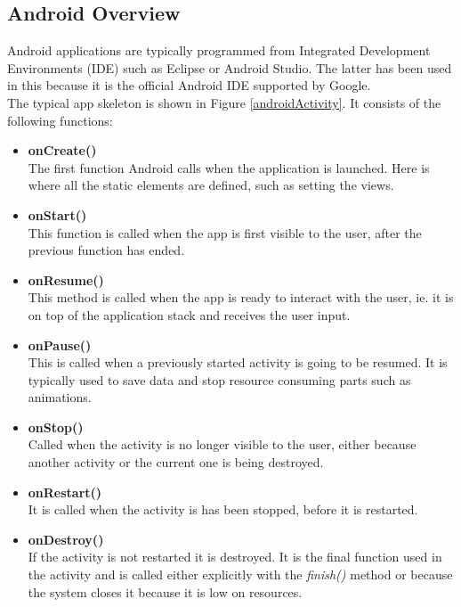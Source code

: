 \subsection{Android Overview}

Android applications are typically programmed from Integrated Development Environments (IDE) such as  Eclipse or Android Studio. The latter has been used in this because it is the official Android IDE supported by Google. \\

The typical app skeleton is shown in Figure \ref{androidActivity}. It consists of the following functions:

	\begin{itemize}

	\item \textbf{onCreate()} \hfill \\
	The first function Android calls when the application is launched. Here is where all the static elements are defined, such as setting the views.
	
	\item \textbf{onStart()} \hfill \\
	This function is called when the app is first visible to the user, after the previous function has ended.


	\item \textbf{onResume()} \hfill \\
	This method is called when the app is ready to interact with the user, ie. it is on top of the application stack and receives the user input.

	\item \textbf{onPause()} \hfill \\
	This is called when a previously started activity is going to be resumed. It is typically used to save data and stop resource consuming parts such as animations.

	\item \textbf{onStop()} \hfill \\
	Called when the activity is no longer visible to the user, either because another activity or the current one is being destroyed.

	\item \textbf{onRestart()} \hfill \\
	It is called when the activity is has been stopped, before it is restarted.

	\item \textbf{onDestroy()} \hfill \\
	If the activity is not restarted it is destroyed. It is the final function used in the activity and is called either explicitly with the \textit{finish()} method or because the system closes it because it is low on resources.


	\end{itemize}
	\bigskip
	
